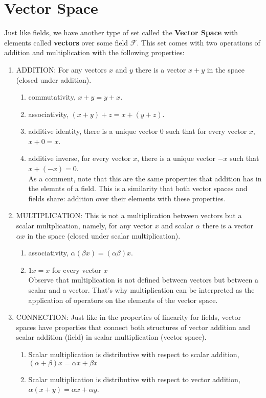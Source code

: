 \documentclass[12pt]{article}
\begin{document}
\section{Vector Space}

Just like fields, we have another type of set called the \textbf{Vector Space} with elements called \textbf{vectors} over some field $\mathcal{F}$. This set comes with two operations of addition and multiplication with the following properties:
\begin{enumerate}
  \item ADDITION: For any vectors $x$ and $y$ there is a vector $x+y$ in the space (closed under addition). 
\begin{enumerate}[label=\arabic*.]
  \item commutativity, $x+y=y+x$.
  \item associativity, $(x+y)+z=x+(y+z)$.
  \item additive identity, there is a unique vector $0$ such that  for every vector $x$, $x+0=x$.
  \item additive inverse, for every vector $x$, there is a unique vector $-x$ such that $x+(-x)=0$.\\

    As a comment, note that this are the same properties that addition has in the elemnts of a field. This is a similarity that both vector spaces and fields share: addition over their elements with these properties.\\
\end{enumerate}
\item MULTIPLICATION: This is not a multiplication between vectors but a scalar multplication, namely, for any vector $x$ and scalar $\alpha$ there is a vector $\alpha x$ in the space (closed under scalar multiplication).
  \begin{enumerate}[label=\arabic*.]
    \item associativity, $\alpha(\beta x) = (\alpha\beta)x$.
    \item $1x = x$ for every vector $x$\\

      Observe that multiplication is not defined between vectors but between a scalar and a vector. That's why multiplication can be interpreted as the application of operators on the elements of the vector space.
\end{enumerate}
\item CONNECTION: Just like in the properties of linearity for fields, vector spaces have properties that connect both structures of vector addition and scalar addition (field) in scalar multiplication (vector space).
\begin{enumerate}[label=\arabic*.]
  \item Scalar multiplication is distributive with respect to scalar addition, $(\alpha+\beta)x = \alpha x+ \beta x$
  \item Scalar multiplication is distributive with respect to  vector addition, $\alpha(x+y) = \alpha x + \alpha y$.
\end{enumerate}
\end{enumerate}
\end{document}
